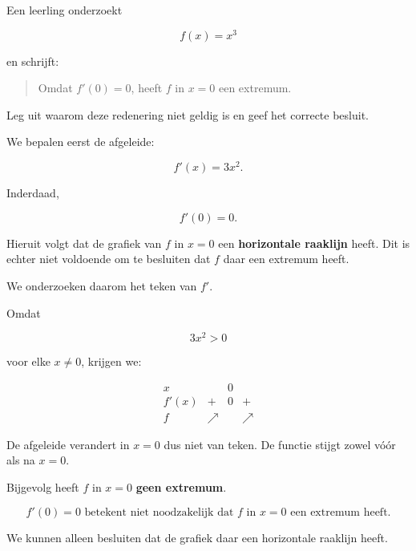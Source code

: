 \documentclass{ximera}
\begin{document}
\begin{oefening}{\oefU\ESS}

Een leerling onderzoekt

\[
f(x)=x^3
\]

en schrijft:

\begin{quote}
Omdat $f'(0)=0$, heeft $f$ in $x=0$ een extremum.
\end{quote}

Leg uit waarom deze redenering niet geldig is en geef het correcte
besluit.

\begin{oplossing}

  We bepalen eerst de afgeleide:
  
  \[
  f'(x)=3x^2.
  \]
  
  Inderdaad,
  
  \[
  f'(0)=0.
  \]
  
  Hieruit volgt dat de grafiek van $f$ in $x=0$ een
  \textbf{horizontale raaklijn} heeft. Dit is echter niet voldoende
  om te besluiten dat $f$ daar een extremum heeft.
  
  We onderzoeken daarom het teken van $f'$.
  
  Omdat
  
  \[
  3x^2>0
  \]
  
  voor elke $x\neq 0$, krijgen we:
  
  \[
  \begin{array}{c|ccc}
  x
  & & 0 & \\ \hline
  f'(x)
  & + & 0 & +\\
  f
  & \nearrow & & \nearrow
  \end{array}
  \]
  
  De afgeleide verandert in $x=0$ dus niet van teken.
  De functie stijgt zowel vóór als na $x=0$.
  
  Bijgevolg heeft $f$ in $x=0$ \textbf{geen extremum}.
  
  \[
  \boxed{
  f'(0)=0
  \text{ betekent niet noodzakelijk dat }f
  \text{ in }x=0\text{ een extremum heeft.}
  }
  \]
  
  We kunnen alleen besluiten dat de grafiek daar een horizontale
  raaklijn heeft.
  
  \end{oplossing}

\end{oefening}


\end{document}
